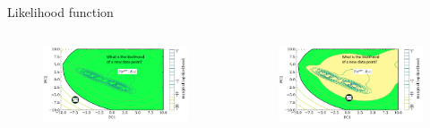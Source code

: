 \documentclass[t]{beamer}
\theoremstyle{definition}
\begin{document}
\begin{frame}{Likelihood function}


    \begin{columns}[T] %
    
    \begin{column}{0.5\textwidth} %
    
        \begin{figure}
        \includegraphics[width=\textwidth]{figs/de_pc1_pc2_likelihood_likelihood_small_threshold_answer_outside.pdf}
    \end{figure}

    \end{column}
    \begin{column}{0.5\textwidth} %
        \begin{figure}
            \includegraphics[width=\textwidth]{figs/de_pc1_pc2_likelihood_likelihood_small_threshold_answer_inside.pdf}
        \end{figure}
    \end{column}

    \end{columns}


\end{frame}
\end{document}
